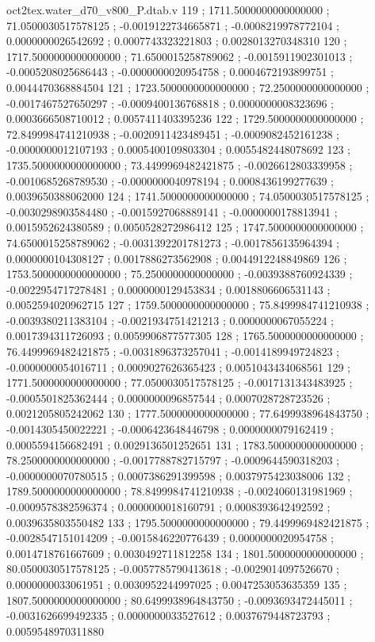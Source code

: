 \begin{filecontents}[overwrite]{oct2tex.water_d70_v800_P.dtab.v}
119 ; 1711.5000000000000000 ; 71.0500030517578125 ; -0.0019122734665871 ; -0.0008219978772104 ; 0.0000000026542692 ; 0.0007743323221803 ; 0.0028013270348310
120 ; 1717.5000000000000000 ; 71.6500015258789062 ; -0.0015911902301013 ; -0.0005208025686443 ; -0.0000000020954758 ; 0.0004672193899751 ; 0.0044470368884504
121 ; 1723.5000000000000000 ; 72.2500000000000000 ; -0.0017467527650297 ; -0.0009400136768818 ; 0.0000000008323696 ; 0.0003666508710012 ; 0.0057411403395236
122 ; 1729.5000000000000000 ; 72.8499984741210938 ; -0.0020911423489451 ; -0.0009082452161238 ; -0.0000000012107193 ; 0.0005400109803304 ; 0.0055482448078692
123 ; 1735.5000000000000000 ; 73.4499969482421875 ; -0.0026612803339958 ; -0.0010685268789530 ; -0.0000000040978194 ; 0.0008436199277639 ; 0.0039650388062000
124 ; 1741.5000000000000000 ; 74.0500030517578125 ; -0.0030298903584480 ; -0.0015927068889141 ; -0.0000000178813941 ; 0.0015952624380589 ; 0.0050528272986412
125 ; 1747.5000000000000000 ; 74.6500015258789062 ; -0.0031392201781273 ; -0.0017856135964394 ; 0.0000000104308127 ; 0.0017886273562908 ; 0.0044912248849869
126 ; 1753.5000000000000000 ; 75.2500000000000000 ; -0.0039388760924339 ; -0.0022954717278481 ; 0.0000000129453834 ; 0.0018806606531143 ; 0.0052594020962715
127 ; 1759.5000000000000000 ; 75.8499984741210938 ; -0.0039380211383104 ; -0.0021934751421213 ; 0.0000000067055224 ; 0.0017394311726093 ; 0.0059906877577305
128 ; 1765.5000000000000000 ; 76.4499969482421875 ; -0.0031896373257041 ; -0.0014189949724823 ; -0.0000000054016711 ; 0.0009027626365423 ; 0.0051043434068561
129 ; 1771.5000000000000000 ; 77.0500030517578125 ; -0.0017131343483925 ; -0.0005501825362444 ; 0.0000000096857544 ; 0.0007028728723526 ; 0.0021205805242062
130 ; 1777.5000000000000000 ; 77.6499938964843750 ; -0.0014305450022221 ; -0.0006423648446798 ; 0.0000000079162419 ; 0.0005594156682491 ; 0.0029136501252651
131 ; 1783.5000000000000000 ; 78.2500000000000000 ; -0.0017788782715797 ; -0.0009644590318203 ; -0.0000000070780515 ; 0.0007386291399598 ; 0.0037975423038006
132 ; 1789.5000000000000000 ; 78.8499984741210938 ; -0.0024060131981969 ; -0.0009578382596374 ; 0.0000000018160791 ; 0.0008393642492592 ; 0.0039635803550482
133 ; 1795.5000000000000000 ; 79.4499969482421875 ; -0.0028547151014209 ; -0.0015846220776439 ; 0.0000000020954758 ; 0.0014718761667609 ; 0.0030492711812258
134 ; 1801.5000000000000000 ; 80.0500030517578125 ; -0.0057785790413618 ; -0.0029014097526670 ; 0.0000000033061951 ; 0.0030952244997025 ; 0.0047253053635359
135 ; 1807.5000000000000000 ; 80.6499938964843750 ; -0.0093693472445011 ; -0.0031626699492335 ; 0.0000000033527612 ; 0.0037679448723793 ; 0.0059548970311880

\end{filecontents}
